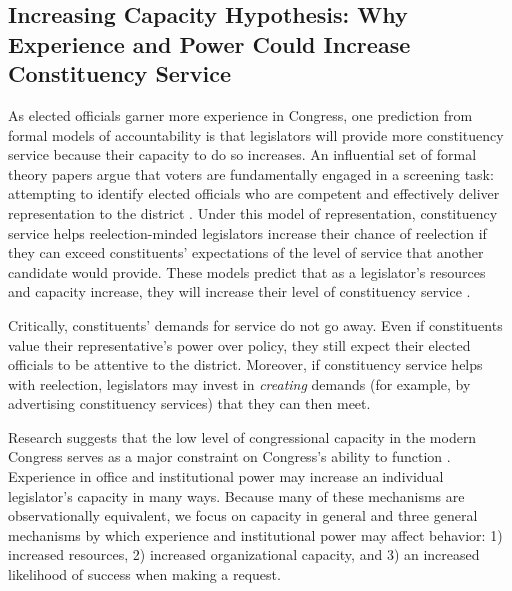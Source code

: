 \documentclass[12pt]{article}
\begin{document}
\subsection{Increasing Capacity Hypothesis: Why Experience and Power Could Increase Constituency Service}


As elected officials garner more experience in Congress, one prediction from formal models of accountability is that legislators will provide more constituency service because their capacity to do so increases. An influential set of formal theory papers argue that voters are fundamentally engaged in a screening task: attempting to identify elected officials who are competent and effectively deliver representation to the district \citep{AshworthBuenodeMesquita2006, gordon2009advantages}. Under this model of representation, constituency service helps reelection-minded legislators increase their chance of reelection if they can exceed constituents' expectations of the level of service that another candidate would provide. %
These models predict that as a legislator's resources and capacity increase, they will increase their level of constituency service \cite[Proposition 1]{AshworthBuenodeMesquita2006}. 


Critically, constituents' demands for service do not go away.%
 Even if constituents value their representative's power over policy, they still expect their elected officials to be attentive to the district. Moreover, if constituency service helps with reelection, legislators may invest in \textit{creating} demands (for example, by advertising constituency services) that they can then meet. %

Research suggests that the low level of congressional capacity in the modern Congress serves as a major constraint on Congress's ability to function \citep{LaPira2020}. %
 Experience in office and institutional power may increase an individual legislator's capacity in many ways. 
Because many of these mechanisms are observationally equivalent, we focus on capacity in general and three general mechanisms by which experience and institutional power may affect behavior: 1) increased resources, 2) increased organizational capacity, and 3) an increased likelihood of success when making a request. 
\end{document}
